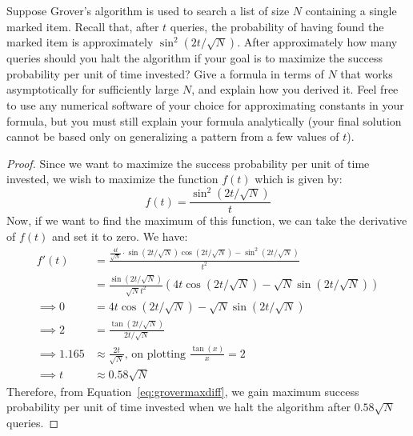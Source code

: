 \begin{solution}[label=ques:1]
  \begin{question}
    Suppose Grover's algorithm is used to search a list of size $N$ containing a single marked item.  Recall that, after $t$ queries, the probability of having found the marked item is approximately $\sin^2\left(2t/\sqrt{N} \right)$.  After approximately how many queries should you halt the algorithm if your goal is to maximize the success probability per unit of time invested? Give a formula in terms of $N$ that works asymptotically for sufficiently large $N$, and explain how you derived it. Feel free to use any numerical software of your choice for approximating constants in your formula, but you must still explain your formula analytically (your final solution cannot be based only on generalizing a pattern from a few values of $t$).
  \end{question}
  \tcblower{}
  \begin{proof}
    Since we want to maximize the success probability per unit of time invested, we wish to maximize the function $f(t)$ which is given by:
    \begin{equation}
        f(t) = \frac{\sin^2\left(2t/\sqrt{N}\right)}{t}
      \label{eq:grovermaxunit}
    \end{equation}
    Now, if we want to find the maximum of this function, we can take the derivative of $f(t)$ and set it to zero.  We have:
    \begin{equation}
      \begin{split}
        f'(t) &= \frac{\frac{4t}{\sqrt{N}}\cdot\sin\left(2t/\sqrt{N}\right)\cos\left(2t/\sqrt{N}\right) - \sin^2\left(2t/\sqrt{N}\right)}{t^2}\\
        &= \frac{\sin\left(2t/\sqrt{N}\right)}{\sqrt{N}t^2}\left(4t\cos\left(2t/\sqrt{N}\right) - \sqrt{N}\sin\left(2t/\sqrt{N}\right)\right)\\
        \implies 0 &= 4t\cos\left(2t/\sqrt{N}\right) - \sqrt{N}\sin\left(2t/\sqrt{N}\right)\\
        \implies 2 &= \frac{\tan\left(2t/\sqrt{N}\right)}{2t/\sqrt{N}}\\
        \implies 1.165 &\approx \frac{2t}{\sqrt{N}}\text{, on plotting }\frac{\tan(x)}{x}=2\\
        \implies t &\approx 0.58\sqrt{N}
      \end{split}
      \label{eq:grovermaxdiff}
    \end{equation}
    Therefore, from Equation~\ref{eq:grovermaxdiff}, we gain maximum success probability per unit of time invested when we halt the algorithm after $0.58\sqrt{N}$ queries.
  \end{proof}
\end{solution}
